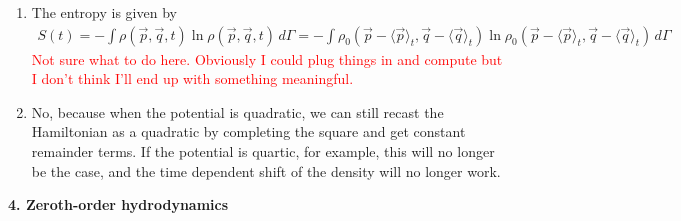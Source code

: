 \documentclass{article}
\theoremstyle{definition}
\begin{document}
\begin{enumerate}[label=(\alph*)]
	
	
	\item The entropy is given by 
	\begin{align*}
	S(t) = -\int \rho(\vec{p},\vec{q},t)\ln \rho(\vec{p},\vec{q},t) \,d\Gamma 
	= -\int \rho_0(\vec{p} - \langle \vec{p}\rangle_t, \vec{q} - \langle \vec{q}\rangle_t)\ln \rho_0(\vec{p} - \langle \vec{p}\rangle_t, \vec{q} - \langle \vec{q}\rangle_t)\,d\Gamma 
	\end{align*}
	\textcolor{red}{Not sure what to do here. Obviously I could plug things in and compute but I don't think I'll end up with something meaningful.}
	
	\item $\boxed{\text{No}}$, because when the potential is quadratic, we can still recast the Hamiltonian as a quadratic by completing the square and get constant remainder terms. If the potential is quartic, for example, this will no longer be the case, and the time dependent shift of the density will no longer work. 
\end{enumerate}



\noindent \textbf{4. Zeroth-order hydrodynamics}
\end{document}
